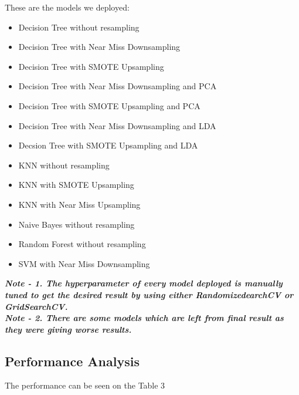 \documentclass{article}
\begin{document}
These are the models we deployed:
\begin{itemize}
    \item Decision Tree without resampling
    \item Decision Tree with Near Miss Downsampling
    \item Decision Tree with SMOTE Upsampling
    \item Decision Tree with Near Miss Downsampling and PCA
    \item Decision Tree with SMOTE Upsampling and PCA
    \item Decision Tree with Near Miss Downsampling and LDA
    \item Decsion Tree with SMOTE Upsampling and LDA
    \item KNN without resampling
    \item KNN with SMOTE Upsampling
    \item KNN with Near Miss Upsampling
    \item Naive Bayes without resampling
    \item Random Forest without resampling
    \item SVM with Near Miss Downsampling
\end{itemize}
\textbf{\textit{Note - 1. The hyperparameter of every model deployed is manually tuned to get the desired result by using either  RandomizedearchCV or GridSearchCV.}}\\
\textbf{\textit{Note - 2. There are some models which are left from final result as they were giving worse results.}}

\subsection{Performance Analysis}

The performance can be seen on the Table 3
\end{document}
